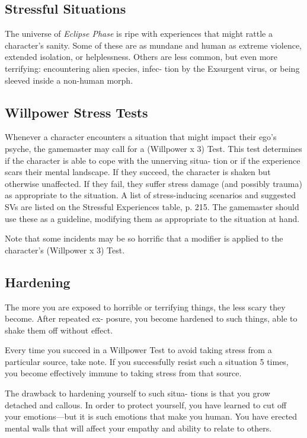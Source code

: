 \subsection{Stressful Situations}

The universe of \textit{Eclipse Phase} is ripe with experiences 
that might rattle a character's sanity. Some of these are 
as mundane and human as extreme violence, extended 
isolation, or helplessness. Others are less common, but 
even more terrifying: encountering alien species, infec-
tion by the Exsurgent virus, or being sleeved inside a 
non-human morph.

\subsection{Willpower Stress Tests}

Whenever a character encounters a situation that 
might impact their ego's psyche, the gamemaster may 
call for a (Willpower x 3) Test. This test determines if 
the character is able to cope with the unnerving situa-
tion or if the experience scars their mental landscape. 
If they succeed, the character is shaken but otherwise 
unaffected. If they fail, they suffer stress damage (and 
possibly trauma) as appropriate to the situation. A 
list of stress-inducing scenarios and suggested SVs are 
listed on the Stressful Experiences table, p. 215. The 
gamemaster should use these as a guideline, modifying 
them as appropriate to the situation at hand.

Note that some incidents may be so horrific that a 
modifier is applied to the character's (Willpower x 3) 
Test.

\subsection{Hardening}

The more you are exposed to horrible or terrifying 
things, the less scary they become. After repeated ex-
posure, you become hardened to such things, able to 
shake them off without effect.

Every time you succeed in a Willpower Test to avoid 
taking stress from a particular source, take note. If you 
successfully resist such a situation 5 times, you become 
effectively immune to taking stress from that source.

The drawback to hardening yourself to such situa-
tions is that you grow detached and callous. In order 
to protect yourself, you have learned to cut off your 
emotions—but it is such emotions that make you 
human. You have erected mental walls that will affect 
your empathy and ability to relate to others.

